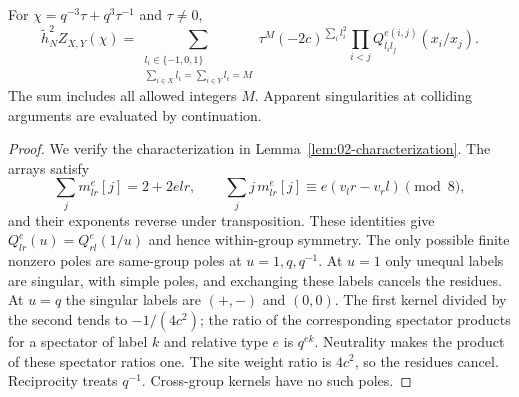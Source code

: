 \begin{theorem}\label{thm:02-finite-formula}\label{E:finite-cylinder}
For $\chi=q^{-3}\tau+q^3\tau^{-1}$ and $\tau\ne0$,
\begin{equation}\label{eq:02-finite-formula}
 \widetilde h_N^2Z_{X,Y}(\chi)
 =\sum_{\substack{l_i\in\{-1,0,1\}\\
           \sum_{i\in X}l_i=\sum_{i\in Y}l_i=M}}
       \tau^M(-2c)^{\sum_i l_i^2}
       \prod_{i<j}Q^{e(i,j)}_{l_il_j}(x_i/x_j).
\end{equation}
The sum includes all allowed integers $M$. Apparent singularities at
colliding arguments are evaluated by continuation.
\end{theorem}
\begin{proof}
We verify the characterization in Lemma~\ref{lem:02-characterization}.
The arrays satisfy
\[
 \sum_jm^e_{lr}[j]=2+2elr,\qquad
 \sum_jj\,m^e_{lr}[j]\equiv e(v_lr-v_rl)\pmod8,
\]
and their exponents reverse under transposition. These identities give
$Q^e_{lr}(u)=Q^e_{rl}(1/u)$ and hence within-group symmetry.
The only possible finite nonzero poles are same-group poles at
$u=1,q,q^{-1}$. At $u=1$ only unequal labels are singular, with simple
poles, and exchanging these labels cancels the residues. At $u=q$
the singular labels are $(+,-)$ and $(0,0)$. The first kernel divided
by the second tends to $-1/(4c^2)$; the ratio of the corresponding
spectator products for a spectator of label $k$ and relative type
$e$ is $q^{ek}$. Neutrality makes the product of these spectator
ratios one. The site weight ratio is $4c^2$, so the residues cancel.
Reciprocity treats $q^{-1}$. Cross-group kernels have no such poles.


\end{proof}
